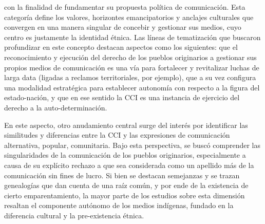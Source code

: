 \documentclass{tufte-handout}
\begin{document}
con la finalidad de fundamentar su propuesta política de comunicación.
Esta categoría define los valores, horizontes emancipatorios y anclajes
culturales que convergen en una manera singular de concebir y gestionar
sus medios, cuyo centro es justamente la identidad étnica. Las líneas de
tematización que buscaron profundizar en este concepto destacan aspectos
como los siguientes: que el reconocimiento y ejecución del derecho de
los pueblos originarios a gestionar sus propios medios de comunicación
es una vía para fortalecer y revitalizar luchas de larga data (ligadas a
reclamos territoriales, por ejemplo), que a su vez configura una
modalidad estratégica para establecer autonomía con respecto a la figura
del estado-nación, y que en ese sentido la CCI es una instancia de
ejercicio del derecho a la auto-determinación.

En este aspecto, otro anudamiento central surge del interés por
identificar las similitudes y diferencias entre la CCI y las expresiones
de comunicación alternativa, popular, comunitaria. Bajo esta
perspectiva, se buscó comprender las singularidades de la comunicación
de los pueblos originarios, especialmente a causa de su explícito
rechazo a que sea considerada como un apellido más de la comunicación
sin fines de lucro. Si bien se destacan semejanzas y se trazan
genealogías que dan cuenta de una raíz común, y por ende de la
existencia de cierto emparentamiento, la mayor parte de los estudios
sobre esta dimensión resaltan el componente autónomo de los medios
indígenas, fundado en la diferencia cultural y la pre-existencia étnica.
\end{document}
